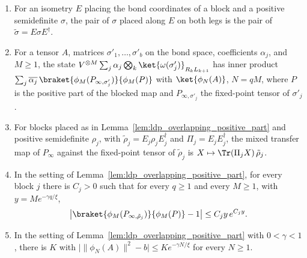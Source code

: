 \begin{lemma}
    \label{lem:ldp_overlapping_overlaps}
    \leanok
    \begin{enumerate}
        \item For an isometry $E$ placing the bond coordinates of a block and a
              positive semidefinite $\sigma$, the pair of $\sigma$ placed along $E$ on
              both legs is the pair of $\tilde\sigma=E\sigma E^\dagger$.
        \item For a tensor $A$, matrices $\sigma'_1,\dots,\sigma'_b$ on the bond space,
              coefficients $\alpha_j$, and $M\geq1$, the state
              $V^{\otimes M}\sum_j\alpha_j\bigotimes_k\ket{\omega(\sigma'_j)}_{R_kL_{k+1}}$
              has inner product
              $\sum_j\overline{\alpha_j}\,\braket{\phi_M(P_{\infty,\sigma'_j})}{\phi_M(P)}$
              with $\ket{\phi_N(A)}$, $N=qM$, where $P$ is the positive part of the
              blocked map and $P_{\infty,\sigma'_j}$ the fixed-point tensor of
              $\sigma'_j$.
        \item For blocks placed as in Lemma~\ref{lem:ldp_overlapping_positive_part}
              and positive semidefinite $\rho_j$, with $\tilde\rho_j=E_j\rho_jE_j^\dagger$
              and $\Pi_j=E_jE_j^\dagger$, the mixed transfer map of $P_\infty$ against the
              fixed-point tensor of $\tilde\rho_j$ is $X\mapsto\Tr(\Pi_jX)\,\tilde\rho_j$.
        \item In the setting of Lemma~\ref{lem:ldp_overlapping_positive_part}, for
              every block $j$ there is $C_j>0$ such that for every $q\geq1$ and every
              $M\geq1$, with $y=Me^{-\gamma q/\xi}$,
              \begin{align*}
                  \bigl\lvert\braket{\phi_M(P_{\infty,\tilde\rho_j})}{\phi_M(P)}-1\bigr\rvert
                  \leq C_jy\,e^{C_jy}.
              \end{align*}
        \item In the setting of Lemma~\ref{lem:ldp_overlapping_positive_part} with
              $0<\gamma<1$, there is $K$ with
              $\bigl\lvert\lVert\phi_N(A)\rVert^2-b\bigr\rvert\leq Ke^{-\gamma N/\xi}$
              for every $N\geq1$.
    \end{enumerate}
\end{lemma}
